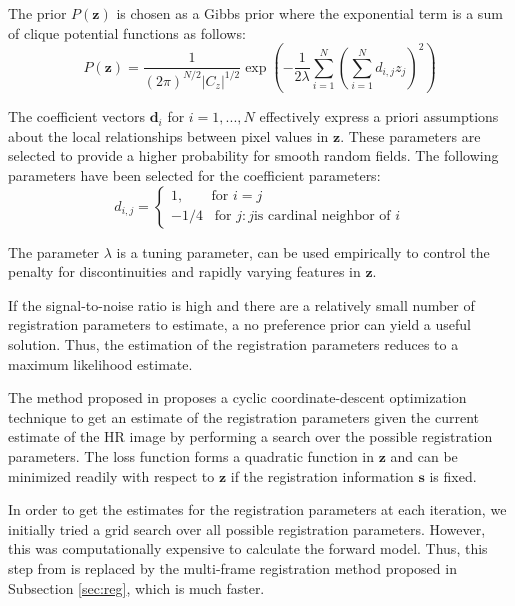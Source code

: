 \documentclass[10pt,twocolumn,letterpaper]{article}
\begin{document}
The prior $P(\mathbf{z})$ is chosen as a Gibbs prior where the exponential term is a sum of clique potential functions as follows:
\begin{equation}
    P(\mathbf{z}) = \frac{1}{(2\pi)^{N/2}|C_z|^{1/2}}\exp\left(-\frac{1}{2\lambda}\sum_{i=1}^{N}\left(\sum_{i=1}^N d_{i,j} z_j\right)^2\right)
\end{equation}{}

The coefficient vectors $\mathbf{d}_i$ for $i = 1, ..., N$ effectively express a priori assumptions about the local relationships between pixel values in $\mathbf{z}$. These parameters are selected to provide a higher probability for smooth random fields. The following parameters have been selected for the coefficient parameters:
\begin{equation}
d_{i,j} = 
    \begin{cases}
    1, \;\;\;\;\;\;\; \text{for } i = j \\
    -1/4 \;\;\; \text{for } j: j \text{is cardinal neighbor of } i
    \end{cases}
\end{equation}{}

The parameter $\lambda$ is a tuning parameter, can be used empirically to control the penalty for discontinuities and rapidly varying features in $\mathbf{z}$. 

If the signal-to-noise ratio is high and there are a relatively small number of registration parameters to estimate, a no preference prior can yield a useful solution. Thus, the estimation of the registration parameters reduces to a maximum likelihood estimate. 

The method proposed in \cite{hardie1997joint} proposes a cyclic coordinate-descent optimization technique to get an estimate of the registration parameters given the current estimate of the HR image by performing a search over the possible registration parameters. The loss function forms a quadratic function in $\mathbf{z}$ and can be minimized readily with respect to $\mathbf{z}$ if the registration information $\mathbf{s}$ is fixed. 

In order to get the estimates for the registration parameters at each iteration, we initially tried a grid search over all possible registration parameters. However, this was computationally expensive to calculate the forward model. Thus, this step from \cite{hardie1997joint} is replaced by the multi-frame registration method proposed in Subsection \ref{sec:reg}, which is much faster.
\end{document}

